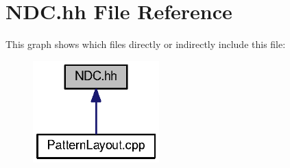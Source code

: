 \section{N\-D\-C.\-hh File Reference}
\label{NDC_8hh}
This graph shows which files directly or indirectly include this file\-:
\nopagebreak
\begin{figure}[H]
\begin{center}
\leavevmode
\includegraphics[width=138pt]{d3/de4/NDC_8hh__dep__incl}
\end{center}
\end{figure}
